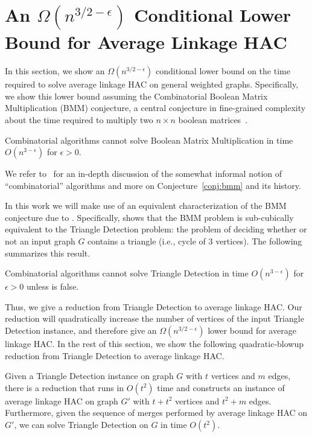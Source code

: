 \section{An \texorpdfstring{\boldmath$\Omega(n^{3/2 - \epsilon})$}{Omega(n\^(3/2-epsilon))} Conditional Lower Bound for Average Linkage HAC}\label{sec:worklb}

In this section, we show an $\Omega(n^{3/2 - \epsilon})$ conditional lower bound on the time required to solve average linkage HAC on general weighted graphs. Specifically, we show this lower bound assuming the Combinatorial Boolean Matrix Multiplication (BMM) conjecture, a central conjecture in fine-grained complexity about the time required to multiply two $n \times n$ boolean matrices~\cite{williams2010subcubic, abboud2024faster}.

\begin{conjecture}\label{conj:bmm}
Combinatorial algorithms cannot solve Boolean Matrix Multiplication in time $O(n^{3-\epsilon})$ for $\epsilon > 0$.
\end{conjecture}
\noindent We refer to~\cite{abboud2024faster} for an in-depth discussion of the somewhat informal notion of ``combinatorial'' algorithms and more on Conjecture~\ref{conj:bmm} and its history.

In this work we will make use of an equivalent characterization of the BMM conjecture due to \cite{williams2010subcubic}. Specifically, \cite{williams2010subcubic} shows that the BMM problem is sub-cubically equivalent to the Triangle Detection problem: the problem of deciding whether or not an input graph $G$ contains a triangle (i.e., cycle of $3$ vertices). The following summarizes this result.
\begin{theorem}\label{thm:bmmeq}
    Combinatorial algorithms cannot solve Triangle Detection in time $O(n^{3-\epsilon})$ for  $\epsilon > 0$ unless  is false.
\end{theorem}
Thus, we give a reduction from Triangle Detection to average linkage HAC. Our reduction will quadratically increase the number of vertices of the input Triangle Detection instance, and therefore give an $\Omega(n^{3/2 - \epsilon})$ lower bound for average linkage HAC. In the rest of this section, we show the following quadratic-blowup reduction from Triangle Detection to average linkage HAC.
%

\begin{theorem}\label{thm:lbreduction}
Given a Triangle Detection instance on graph $G$ with $t$ vertices and $m$ edges, there is a reduction that runs in $O(t^2)$ time and constructs an instance of average linkage HAC on graph $G'$ with $t + t^2$ vertices and $t^2 + m$ edges. 
Furthermore, given the sequence of merges performed by average linkage HAC on $G'$, we can solve Triangle Detection on $G$ in time $O(t^2)$.
\end{theorem}

